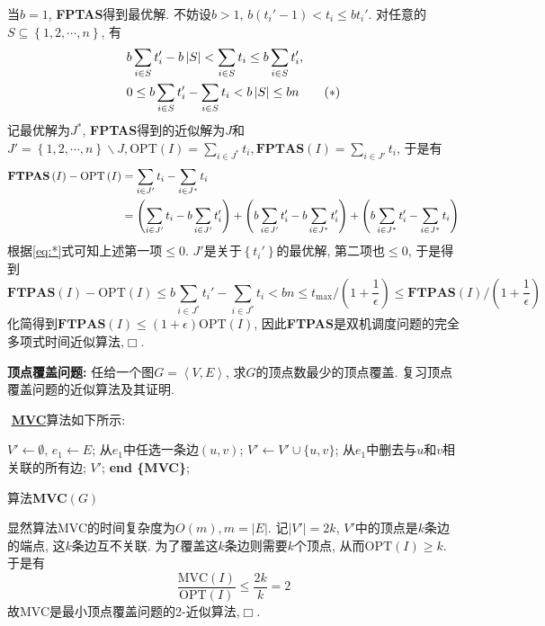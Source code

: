\documentclass{article}
\begin{document}
\begin{homeworkProblem}
    当$b=1$, \textbf{FPTAS}得到最优解. 不妨设$b>1$, $b\left( t_i'-1 \right) <t_i\le bt_i'$. 对任意的$S\subseteq \left\{ 1,2,\cdots ,n \right\} $, 有
    \begin{align}
        & b\sum_{i\in S}{t_i'}-b\left| S \right|<\sum_{i\in S}{t_i}\le b\sum_{i\in S}{t_i'}, \notag
        \\
        & 0\le b\sum_{i\in S}{t_i'}-\sum_{i\in S}{t_i}<b\left| S \right|\le bn \tag{$\ast$} \label{eq:*}
    \end{align}
    记最优解为$J^{\ast}$, \textbf{FPTAS}得到的近似解为$J$和$\displaystyle J'=\left\{ 1,2,\cdots,n \right\}\backslash J,\text{OPT}(I)=\sum_{i\in J^{\ast}}{t_i}, \textbf{FPTAS}(I)=\sum_{i\in J'}{t_i}$, 于是有
    \begin{align}
        \textbf{FTPAS}\left( I \right) -\text{OPT}\left( I \right) &=\sum_{i\in J'}{t_i}-\sum_{i\in J^{\ast}}{t_i} \notag
        \\
        &=\left( \sum_{i\in J'}{t_i}-b\sum_{i\in J'}{t_i'} \right) +\left( b\sum_{i\in J'}{t_i'}-b\sum_{i\in J^{\ast}}{t_i'} \right) +\left( b\sum_{i\in J^{\ast}}{t_i'}-\sum_{i\in J^{\ast}}{t_i} \right) \notag
    \end{align}
    根据\eqref{eq:*}式可知上述第一项$\leq 0$. $J'$是关于$\left\{ t_i' \right\}$的最优解, 第二项也$\leq 0$, 于是得到$$\textbf{FTPAS}\left( I \right) -\text{OPT}\left( I \right) \le b\sum_{i\in J^{\ast}}{t_i'}-\sum_{i\in J^{\ast}}{t_i}<bn\le t_{\text{max}}\bigg/\left( 1+\frac{1}{\epsilon} \right) \le \textbf{FTPAS}\left( I \right) \bigg/\left( 1+\frac{1}{\epsilon} \right) 
    $$
    化简得到$\textbf{FTPAS}(I)\leq (1+\epsilon)\text{OPT}(I)$, 因此\textbf{FTPAS}是双机调度问题的完全多项式时间近似算法,$\Box.$
\end{homeworkProblem}

\pagebreak

\begin{homeworkProblem}
    \textbf{顶点覆盖问题:} 任给一个图$G=\left<V,E\right>$, 求$G$的顶点数最少的顶点覆盖. 复习顶点覆盖问题的近似算法及其证明.

    \solution \,\,\hyperlink{alg:MVC}{\textbf{MVC}}算法如下所示: 
    \begin{algorithm}[H]
		\begin{algorithmic}[1]
        \State $V'\gets \emptyset$, $e_1\gets E$;
            \State 从$e_1$中任选一条边$(u,v)$;
            \State $V'\gets V' \cup \{u,v\}$;
            \State 从$e_1$中删去与$u$和$v$相关联的所有边;
        \EndWhile
        \State \Return $V'$;
		\State \textbf{end \{MVC\}};
		\end{algorithmic}
		\caption{算法\textbf{MVC}$(G)$}
		\label{alg:MVC}
	\end{algorithm}
    显然算法MVC的时间复杂度为$O(m),m=|E|$. 记$\left|V'\right|=2k$, $V'$中的顶点是$k$条边的端点, 这$k$条边互不关联. 为了覆盖这$k$条边则需要$k$个顶点, 从而$\text{OPT}(I)\geq k$. 于是有$$\frac{\text{MVC}\left( I \right)}{\text{OPT}\left( I \right)}\le \frac{2k}{k}=2
    $$
    故MVC是最小顶点覆盖问题的2-近似算法,$\Box.$
\end{homeworkProblem}
\end{document}
